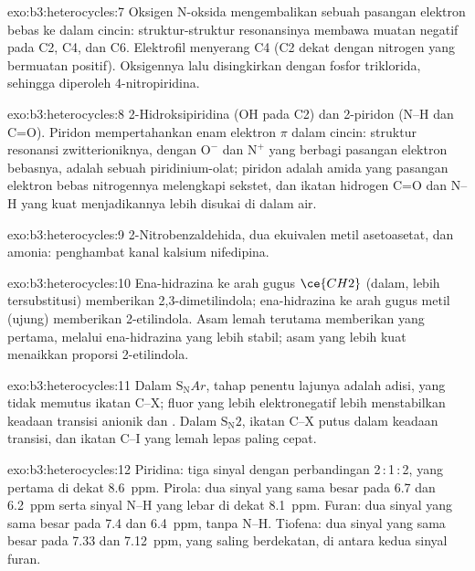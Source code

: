 \begin{solution}{exo:b3:heterocycles:7}
Oksigen N-oksida mengembalikan sebuah pasangan elektron bebas ke dalam cincin: struktur-struktur
resonansinya membawa muatan negatif pada C2, C4, dan C6. Elektrofil menyerang C4 (C2
dekat dengan nitrogen yang bermuatan positif). Oksigennya lalu disingkirkan dengan
fosfor triklorida, sehingga diperoleh 4-nitropiridina.
\end{solution}

\begin{solution}{exo:b3:heterocycles:8}
2-Hidroksipiridina (OH pada C2) dan 2-piridon (N--H dan C=O). Piridon mempertahankan enam
elektron $\pi$ dalam cincin: struktur resonansi zwitterioniknya, dengan $\mathrm{O^-}$ dan
$\mathrm{N^+}$ yang berbagi pasangan elektron bebasnya, adalah sebuah piridinium-olat; piridon adalah amida yang
pasangan elektron bebas nitrogennya melengkapi sekstet, dan ikatan hidrogen C=O dan N--H yang kuat
menjadikannya lebih disukai di dalam air.
\end{solution}

\begin{solution}{exo:b3:heterocycles:9}
2-Nitrobenzaldehida, dua ekuivalen metil asetoasetat, dan amonia: penghambat
kanal kalsium nifedipina.
\end{solution}

\begin{solution}{exo:b3:heterocycles:10}
Ena-hidrazina ke arah gugus $\ce{CH2}$ (dalam, lebih tersubstitusi) memberikan
2,3-dimetilindola; ena-hidrazina ke arah gugus metil (ujung) memberikan 2-etilindola.
Asam lemah terutama memberikan yang pertama, melalui ena-hidrazina yang lebih stabil;
asam yang lebih kuat menaikkan proporsi 2-etilindola.
\end{solution}

\begin{solution}{exo:b3:heterocycles:11}
Dalam $\mathrm S_\mathrm NAr$, tahap penentu lajunya adalah adisi, yang tidak memutus ikatan
C--X; fluor yang lebih elektronegatif lebih menstabilkan keadaan transisi anionik
dan . Dalam $\mathrm S_\mathrm N2$, ikatan C--X putus dalam
keadaan transisi, dan ikatan C--I yang lemah lepas paling cepat.
\end{solution}

\begin{solution}{exo:b3:heterocycles:12}
Piridina: tiga sinyal dengan perbandingan 2\,:\,1\,:\,2, yang pertama di dekat \qty{8.6}{ppm}. Pirola: dua sinyal
yang sama besar pada 6.7 dan \qty{6.2}{ppm} serta sinyal N--H yang lebar di dekat \qty{8.1}{ppm}. Furan: dua sinyal yang sama besar pada
7.4 dan \qty{6.4}{ppm}, tanpa N--H. Tiofena: dua sinyal yang sama besar pada 7.33 dan \qty{7.12}{ppm}, yang saling
berdekatan, di antara kedua sinyal furan.
\end{solution}

